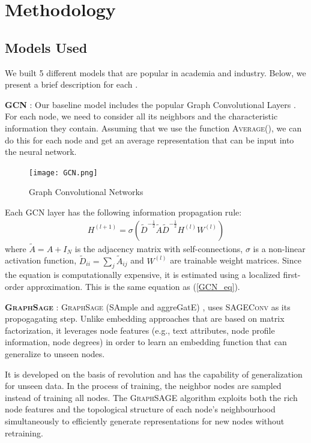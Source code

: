 \documentclass[sigconf, nonacm]{acmart}
\begin{document}
\section*{Methodology}

\subsection*{Models Used} 
We built 5 different models that are popular in academia and industry. Below, we present a brief description for each .

\textbf{\textsc{GCN}} : Our baseline model includes the popular Graph Convolutional Layers \cite{Kipf&Welling2017}. For each node, we need to consider all its neighbors and the characteristic information they contain. Assuming that we use the function \textsc{Average()}, we can do this for each node and get an average representation that can be input into the neural network.

\begin{figure}[htp]
    \centering
    \texttt{[image: GCN.png]}
    \caption{Graph Convolutional Networks \cite{Kipf&Welling2017}}
    \label{fig:GCN}
\end{figure}

Each \textsc{GCN} layer has the following information propagation rule:
\begin{align}
    H^{\left(l+1 \right)} = \sigma \left(\tilde D^{-\frac{1}{2}} \tilde A \tilde D^{-\frac{1}{2}} H^{(l)} W^{(l)} \right)
\end{align}
where $\tilde A = A + I_N$ is the adjacency matrix with self-connections, $\sigma$ is a non-linear activation function, $\tilde D_{ii} = \sum_j \tilde A_{ij}$ and $W^{(l)}$ are trainable weight matrices. Since the equation is computationally expensive, it is estimated using a localized first-order approximation. This is the same equation as (\ref{GCN_eq}).

\textbf{\textsc{GraphSage}} : \textsc{GraphSage} (SAmple and aggreGatE) \cite{Hamiltonetal.2017}, uses \textsc{SAGEConv} as its propogagating step. Unlike embedding approaches that are based on matrix factorization, it leverages node features (e.g., text attributes, node profile information, node degrees) in order to learn an embedding function that can generalize to unseen nodes. 

It is developed on the basis of revolution and has the capability of generalization for unseen data. In the process of training, the neighbor nodes are sampled instead of training all nodes. The \textsc{GraphSAGE} algorithm exploits both the rich node features and the topological structure of each node’s neighbourhood simultaneously to efficiently generate representations for new nodes without retraining.
\end{document}
